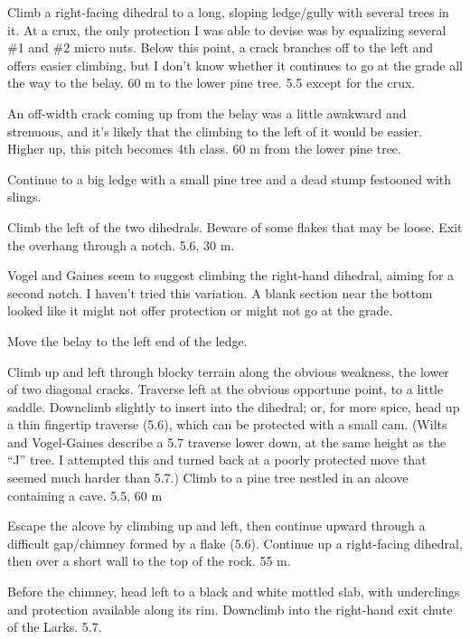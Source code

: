 \documentclass{tahquitz}
\begin{document}
 Climb a right-facing dihedral to a long, sloping ledge/gully with
several trees in it. At a crux, the only protection I was able to devise was by
equalizing several \#1 and \#2 micro nuts. Below this point, a crack branches off
to the left and offers easier climbing, but I don't know whether it continues
to go at the grade all the way to the belay. 60 m to the lower pine tree. 5.5 except for
the crux.

 An off-width crack coming up from the belay was a little awakward and strenuous, and
it's likely that the climbing to the left of it would be easier. Higher up, this pitch
becomes 4th class. 60 m from the lower pine tree.

 Continue to a big ledge with a small pine tree and a dead stump festooned with
slings.

 Climb the left of the two dihedrals. Beware of some flakes that may be loose.
Exit the overhang through a notch. 5.6, 30 m.

 Vogel and Gaines seem to suggest climbing the right-hand dihedral,
aiming for a second notch. I haven't tried this variation.
A blank section near the bottom looked like it might not
offer protection or might not go at the grade.

 Move the belay to the left end of the ledge.


 Climb up and left through blocky terrain along the obvious weakness, the
lower of two diagonal cracks. Traverse left at the obvious opportune point, to a
little saddle. Downclimb slightly to insert into the dihedral; or, for more spice,
head up a thin fingertip traverse (5.6),
which can be protected with a small cam. (Wilts and Vogel-Gaines describe a 5.7 traverse lower
down, at the same height as the ``J'' tree. I attempted this and turned back at a poorly
protected move that seemed much harder than 5.7.)
Climb to a pine tree nestled in an alcove containing a cave. 5.5, 60 m

 Escape the alcove by climbing up and left, then continue upward through a
difficult gap/chimney formed by a flake (5.6). Continue up a right-facing dihedral, then
over a short wall to the top
of the rock. 55 m.

 Before the chimney, head left to a black and white mottled slab, with underclings
and protection available along its rim. Downclimb into the right-hand exit chute of the Larks. 5.7.
\end{document}

